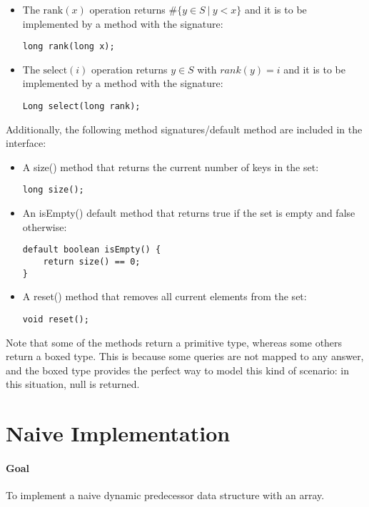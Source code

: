 \begin{itemize}
    \item
    The $\text{rank}(x)$ operation returns $\#\{ y \in S\ |\ y < x\}$ and it is to be implemented by a method with the signature:
    \begin{lstlisting}
long rank(long x);
    \end{lstlisting}

    \item
    The $\text{select}(i)$ operation returns $y \in S$ with $rank(y) = i$ and it is to be implemented by a method with the signature:
    \begin{lstlisting}
Long select(long rank);
    \end{lstlisting}
\end{itemize}
Additionally, the following method signatures/default method are included in the interface:
\begin{itemize}
    \item
    A {\ttfamily size()} method that returns the current number of keys in the set:
    \begin{lstlisting}
long size();
    \end{lstlisting}

    \item
    An {\ttfamily isEmpty()} default method that returns {\ttfamily true} if the set is empty and {\ttfamily false} otherwise:
    \begin{lstlisting}
default boolean isEmpty() {
    return size() == 0;
}
    \end{lstlisting}

    \item
    A {\ttfamily reset()} method that removes all current elements from the set:
    \begin{lstlisting}
void reset();
    \end{lstlisting}
\end{itemize}

Note that some of the methods return a primitive type, whereas some others return a boxed type. This is because some queries are not mapped to any answer, and the boxed type provides the perfect way to model this kind of scenario: in this situation, {\ttfamily null} is returned.

\newpage
\section{Naive Implementation} \label{sec:naiveImplementation}

\paragraph*{Goal}
To implement a naive dynamic predecessor data structure with an array.

